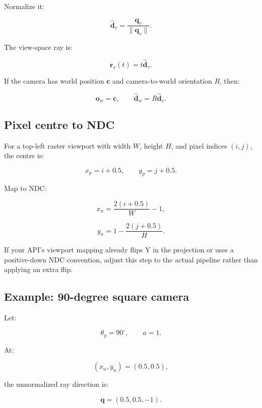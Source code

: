 Normalize it:

\[ \boxed{ \hat{\mathbf d}_v= \frac{\mathbf q_v}{\|\mathbf q_v\|}. } \]

The view-space ray is:

\[ \boxed{ \mathbf r_v(t)=t\hat{\mathbf d}_v. } \]

If the camera has world position \(\mathbf c\) and camera-to-world orientation \(R\), then:

\[ \boxed{ \mathbf o_w=\mathbf c, \qquad \hat{\mathbf d}_w=R\hat{\mathbf d}_v. } \]

\subsection{Pixel centre to NDC}\label{02-foundations-ii-ch035-pixel-centre-to-ndc}

\hypertarget{02-foundations-ii-ch035-pixel-centre-to-ndc}{}

For a top-left raster viewport with width \(W\), height \(H\), and pixel indices \((i,j)\), the centre is:

\[ x_p=i+0.5, \qquad y_p=j+0.5. \]

Map to NDC:

\[ \boxed{ x_n=\frac{2(i+0.5)}W-1, } \]

\[ \boxed{ y_n=1-\frac{2(j+0.5)}H. } \]

If your API's viewport mapping already flips Y in the projection or uses a positive-down NDC convention, adjust this step to the actual pipeline rather than applying an extra flip.

\begin{allmightroleexample}

\subsection{Example: 90-degree square camera}\label{02-foundations-ii-ch035-example-90-degree-square-camera}

\hypertarget{02-foundations-ii-ch035-example-90-degree-square-camera}{}

Let:

\end{allmightroleexample}

\[ \theta_y=90^\circ,\qquad a=1. \]

At:

\[ (x_n,y_n)=(0.5,0.5), \]

the unnormalized ray direction is:

\[ \mathbf q=(0.5,0.5,-1). \]

